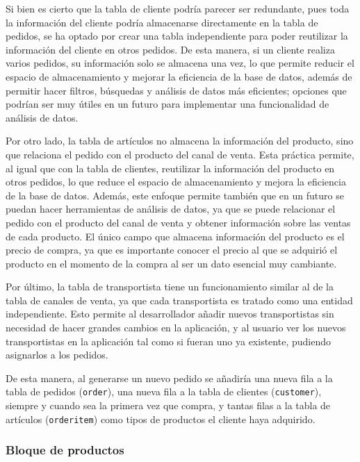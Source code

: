 Si bien es cierto que la tabla de cliente podría parecer ser redundante, pues toda la información del cliente podría almacenarse directamente en la tabla de pedidos, se ha optado por crear una tabla independiente para poder reutilizar la información del cliente en otros pedidos. De esta manera, si un cliente realiza varios pedidos, su información solo se almacena una vez, lo que permite reducir el espacio de almacenamiento y mejorar la eficiencia de la base de datos, además de permitir hacer filtros, búsquedas y análisis de datos más eficientes; opciones que podrían ser muy útiles en un futuro para implementar una funcionalidad de análisis de datos.

Por otro lado, la tabla de artículos no almacena la información del producto, sino que relaciona el pedido con el producto del canal de venta. Esta práctica permite, al igual que con la tabla de clientes, reutilizar la información del producto en otros pedidos, lo que reduce el espacio de almacenamiento y mejora la eficiencia de la base de datos. Además, este enfoque permite también que en un futuro se puedan hacer herramientas de análisis de datos, ya que se puede relacionar el pedido con el producto del canal de venta y obtener información sobre las ventas de cada producto. El único campo que almacena información del producto es el precio de compra, ya que es importante conocer el precio al que se adquirió el producto en el momento de la compra al ser un dato esencial muy cambiante.

Por último, la tabla de transportista tiene un funcionamiento similar al de la tabla de canales de venta, ya que cada transportista es tratado como una entidad independiente. Esto permite al desarrollador añadir nuevos transportistas sin necesidad de hacer grandes cambios en la aplicación, y al usuario ver los nuevos transportistas en la aplicación tal como si fueran uno ya existente, pudiendo asignarlos a los pedidos.

De esta manera, al generarse un nuevo pedido se añadiría una nueva fila a la tabla de pedidos (\texttt{order}), una nueva fila a la tabla de clientes (\texttt{customer}), siempre y cuando sea la primera vez que compra, y tantas filas a la tabla de artículos (\texttt{orderitem}) como tipos de productos el cliente haya adquirido.

\subsubsection{Bloque de productos}

